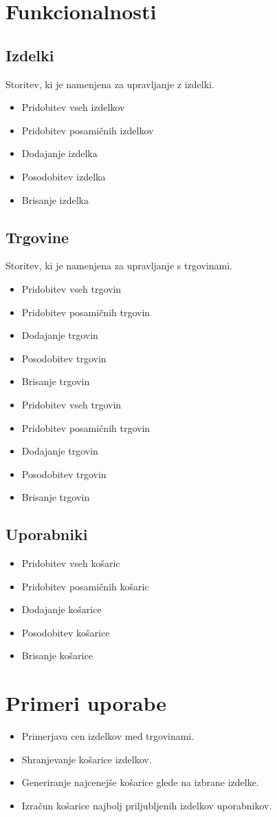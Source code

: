 \documentclass{article}
\begin{document}
\section{Funkcionalnosti}
\subsection{Izdelki}
Storitev, ki je namenjena za upravljanje z izdelki.

\begin{itemize}
    \item Pridobitev vseh izdelkov
    \item Pridobitev posamičnih izdelkov
    \item Dodajanje izdelka
    \item Posodobitev izdelka
    \item Brisanje izdelka
\end{itemize}

\subsection{Trgovine}
Storitev, ki je namenjena za upravljanje s trgovinami.

\begin{itemize}
    \item Pridobitev vseh trgovin
    \item Pridobitev posamičnih trgovin
    \item Dodajanje trgovin
    \item Posodobitev trgovin
    \item Brisanje trgovin
\end{itemize}

\begin{itemize}
    \item Pridobitev vseh trgovin
    \item Pridobitev posamičnih trgovin
    \item Dodajanje trgovin
    \item Posodobitev trgovin
    \item Brisanje trgovin
\end{itemize}

\subsection{Uporabniki}
\begin{itemize}
    \item Pridobitev vseh košaric
    \item Pridobitev posamičnih košaric
    \item Dodajanje košarice
    \item Posodobitev košarice
    \item Brisanje košarice
\end{itemize}

\section{Primeri uporabe}
\begin{itemize}
    \item Primerjava cen izdelkov med trgovinami.
    \item Shranjevanje košarice izdelkov.
    \item Generiranje najcenejše košarice glede na izbrane izdelke.
    \item Izračun košarice najbolj priljubljenih izdelkov uporabnikov.
\end{itemize}
\end{document}
